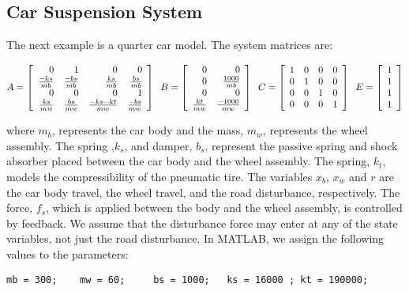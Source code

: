 \documentclass{amsart}
\theoremstyle{definition}
\theoremstyle{remark}
\numberwithin{equation}{section}
\begin{document}
\subsection{Car Suspension System}\label{ex:ex2}
The next example is a quarter car model.  The system matrices are: 

\begin{equation}
\begin{aligned}
A = \displaystyle \left [ \begin{array}{rrrr}
0 & 1 & 0 & 0 \\
\frac{-ks}{mb} & \frac{-bs}{mb} & \frac{ks}{mb} & \frac{bs}{mb} \\
 0 & 0 & 0 & 1 \\
 \frac{ks}{mw} & \frac{bs}{mw} & \frac{-ks-kt}{mw} & \frac{-bs}{mw}
 \end{array} \right ] \hspace{2mm} B= \displaystyle \left [ \begin{array}{rr} 
 0 & 0\\
 0 & \frac{1000}{mb}\\
 0 & 0 \\
 \frac{kt}{mw} & \frac{-1000}{mw}
 \end{array} \right ] \hspace{2mm} C = \displaystyle \left [ \begin{array}{rrrr} 
1 & 0 & 0 & 0 \\ 
0 & 1 & 0 & 0 \\
0 & 0 & 1 & 0 \\
0 & 0 & 0 & 1
\end{array} \right ] \hspace{2mm} E = \displaystyle \left [ \begin{array}{r} 
1\\ 
1\\
1\\
1 \end{array} \right ]
\end{aligned}
\end{equation}

where $m_b$, represents the car body and the mass, $m_w$, represents the wheel assembly. The spring ,$k_s$, and damper, $b_s$, represent the passive spring and shock absorber placed between the car body and the wheel assembly.  The spring, $k_t$, models the compressibility of the pneumatic tire. The variables $x_b$, $x_w$ and $r$ are the car body travel, the wheel travel, and the road disturbance, respectively.  The force, $f_s$, which is applied between the body and the wheel assembly, is controlled by feedback. We assume that the disturbance force may enter at any of the state variables, not just the road disturbance. In MATLAB, we assign the following values to the parameters:
\begin{verbatim}
mb = 300;    mw = 60;     bs = 1000;   ks = 16000 ; kt = 190000; \end{verbatim}
\end{document}
